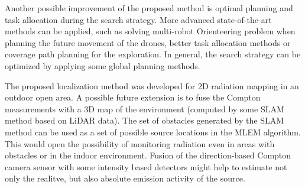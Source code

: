 Another possible improvement of the proposed method is optimal planning and task allocation during the search strategy.
More advanced state-of-the-art methods can be applied, such as solving multi-robot Orienteering problem when planning the future movement of the drones, better task allocation methods or coverage path planning for the exploration.
In general, the search strategy can be optimized by applying some global planning methods.

The proposed localization method was developed for 2D radiation mapping in an outdoor open area.
A possible future extension is to fuse the Compton measurements with a 3D map of the environment (computed by some \ac{SLAM} method based on \ac{LiDAR} data).
The set of obstacles generated by the \ac{SLAM} method can be used as a set of possible source locations in the \ac{MLEM} algorithm.
This would open the possibility of monitoring radiation even in areas with obstacles or in the indoor environment.
Fusion of the direction-based Compton camera sensor with some intensity based detectors might help to estimate not only the realitve, but also absolute emission activity of the source. 








